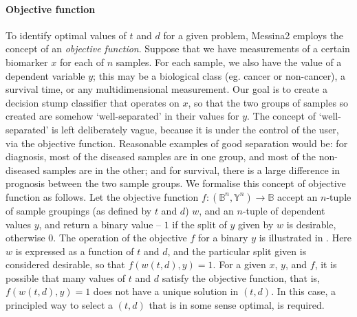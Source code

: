 \documentclass[dissertation.tex]{subfiles}
\begin{document}
\paragraph{Objective function}
To identify optimal values of $t$ and $d$ for a given problem, Messina2 employs the concept of an \emph{objective function}.  Suppose that we have measurements of a certain biomarker $x$ for each of $n$ samples.  For each sample, we also have the value of a dependent variable $y$; this may be a biological class (eg. cancer or non-cancer), a survival time, or any multidimensional measurement.  Our goal is to create a decision stump classifier that operates on $x$, so that the two groups of samples so created are somehow `well-separated' in their values for $y$.  The concept of `well-separated' is left deliberately vague, because it is under the control of the user, via the objective function.  Reasonable examples of good separation would be: for diagnosis, most of the diseased samples are in one group, and most of the non-diseased samples are in the other; and for survival, there is a large difference in prognosis between the two sample groups.  We formalise this concept of objective function as follows.  Let the objective function $f: (\mathbb{B}^n, \mathbb{Y}^n) \rightarrow \mathbb{B}$ accept an $n$-tuple of sample groupings (as defined by $t$ and $d$) $w$, and an $n$-tuple of dependent values $y$, and return a binary value -- $1$ if the split of $y$ given by $w$ is desirable, otherwise $0$.  The operation of the objective $f$ for a binary $y$ is illustrated in .  Here $w$ is expressed as a function of $t$ and $d$, and the particular split given is considered desirable, so that $f(w(t, d), y) = 1$.  For a given $x$, $y$, and $f$, it is possible that many values of $t$ and $d$ satisfy the objective function, that is, $f(w(t, d), y) = 1$ does not have a unique solution in $(t, d)$.  In this case, a principled way to select a $(t, d)$ that is in some sense optimal, is required.
\end{document}

